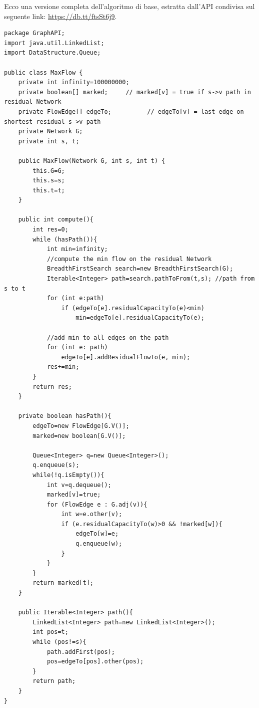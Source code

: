 \documentclass[a4paper]{book}
\begin{document}
Ecco una versione completa dell'algoritmo di base, estratta dall'API condivisa sul seguente link: \url{https://db.tt/ftsSt6j9}.
\begin{lstlisting}
package GraphAPI;
import java.util.LinkedList;
import DataStructure.Queue;

public class MaxFlow {
	private int infinity=100000000;
    private boolean[] marked;     // marked[v] = true if s->v path in residual Network
    private FlowEdge[] edgeTo;    		// edgeTo[v] = last edge on shortest residual s->v path
    private Network G;
    private int s, t;

    public MaxFlow(Network G, int s, int t) {
    	this.G=G;
    	this.s=s;
    	this.t=t;
    }

    public int compute(){
    	int res=0;
    	while (hasPath()){
    		int min=infinity;
    		//compute the min flow on the residual Network
    		BreadthFirstSearch search=new BreadthFirstSearch(G);
    		Iterable<Integer> path=search.pathToFrom(t,s); //path from s to t
    		for (int e:path)
    			if (edgeTo[e].residualCapacityTo(e)<min)
    				min=edgeTo[e].residualCapacityTo(e);
    		
    		//add min to all edges on the path
    		for (int e: path)
    			edgeTo[e].addResidualFlowTo(e, min);
    		res+=min;
    	}
    	return res;
    }
  
    private boolean hasPath(){
    	edgeTo=new FlowEdge[G.V()];
    	marked=new boolean[G.V()];
    	
    	Queue<Integer> q=new Queue<Integer>();
    	q.enqueue(s);
    	while(!q.isEmpty()){
    		int v=q.dequeue();
    		marked[v]=true;
    		for (FlowEdge e : G.adj(v)){
    			int w=e.other(v);
    			if (e.residualCapacityTo(w)>0 && !marked[w]){
    				edgeTo[w]=e;
    				q.enqueue(w);
    			}
    		}
    	}
    	return marked[t];
    }
    
    public Iterable<Integer> path(){
    	LinkedList<Integer> path=new LinkedList<Integer>();
    	int pos=t;
    	while (pos!=s){
    		path.addFirst(pos);
    		pos=edgeTo[pos].other(pos);
     	}
    	return path;
    }
}
\end{lstlisting} 
\end{document}
